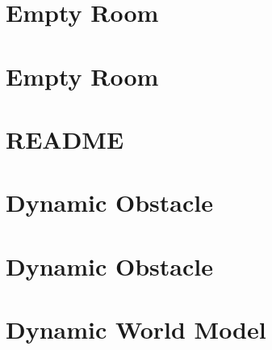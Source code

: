 \documentclass[twoside]{book}
\newcommand{\+}{\discretionary{\mbox{\scriptsize$\hookleftarrow$}}{}{}}
\begin{document}
\chapter{Empty Room}
\label{md_smacc2_sm_reference_library_sm_dance_bot_warehouse_2_models_empty_room_copy_README}

\chapter{Empty Room}
\label{md_smacc2_sm_reference_library_sm_dance_bot_warehouse_2_models_empty_room_README}

\chapter{README}
\label{md_smacc2_sm_reference_library_sm_dance_bot_warehouse_2_README}

\chapter{Dynamic Obstacle}
\label{md_smacc2_sm_reference_library_sm_dance_bot_warehouse_3_models_dynamic_obstacle_copy_README}

\chapter{Dynamic Obstacle}
\label{md_smacc2_sm_reference_library_sm_dance_bot_warehouse_3_models_dynamic_obstacle_README}

\chapter{Dynamic World Model}
\label{md_smacc2_sm_reference_library_sm_dance_bot_warehouse_3_models_dynamic_world_copy_README}

\end{document}
